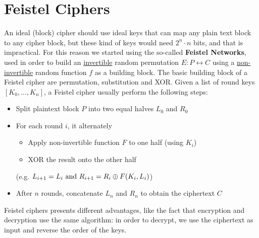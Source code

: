 \section{Feistel Ciphers}
An ideal (block) cipher should use ideal keys that can map any plain text block to any cipher block, but these kind of keys would need $2^n\cdot n$ bits, and that is impractical. For this reason we started using the so-called \textbf{Feistel Networks}, used in order to build an \underline{invertible} random permutation $E:P\leftrightarrow C$ using a \underline{non-invertible} random function $f$ as a building block. The basic building block of a Feistel cipher are permutation, substitution and XOR. 
Given a list of round keys $[K_0,...,K_n]$, a Feistel cipher usually perform the following steps:
\begin{itemize}
    \item Split plaintext block $P$ into two equal halves $L_0$ and $R_0$
    \item For each round $i$, it alternately
    \begin{itemize}
        \item Apply non-invertible function $F$ to one half (using $K_i$)
        \item XOR the result onto the other half 
    \end{itemize}
    (e.g. $L_{i+1} = L_i \text{ and } R_{i+1} = R_i \oplus F(K_i, L_i)$)
    \item After $n$ rounds, concatenate $L_n$ and $R_n$ to obtain the ciphertext $C$
\end{itemize}
Feistel ciphers presents different advantages, like the fact that encryption and decryption use the same algorithm: in order to decrypt, we use the ciphertext as input and reverse the order of the keys.

